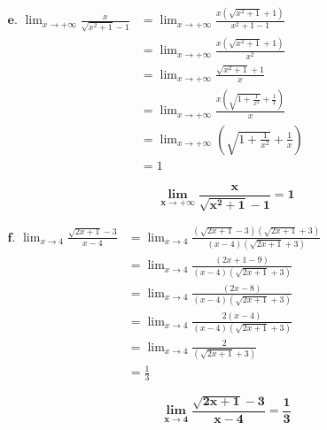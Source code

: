 \documentclass[12pt,a4paper]{article}
\begin{document}
\(
\begin{aligned}
\textbf{e. }\lim_{x \to +\infty} \frac{x}{\sqrt{x^2 +1}-1} &= \lim_{x \to +\infty} \frac{x(\sqrt{x^2 +1}+1)}{x^2 +1-1}\\
																													 &= \lim_{x \to +\infty} \frac{x(\sqrt{x^2 +1}+1)}{x^2}\\
																													 &= \lim_{x \to +\infty} \frac{\sqrt{x^2 +1}+1}{x}\\
																													 &= \lim_{x \to +\infty} \frac{x\left(\sqrt{1 + \frac{1}{x^{2}}}+\frac{1}{x}\right)}{x}\\																													 
																													 &= \lim_{x \to +\infty}\left(\sqrt{1 + \frac{1}{x^{2}}}+\frac{1}{x}\right)\\
																													 &= 1
\end{aligned}
\)

									  \begin{resultbox}
                        \[
                            \mathbf{ \lim_{x \to +\infty} \frac{x}{\sqrt{x^2 +1}-1} = 1 }
                        \]
                    \end{resultbox}	
                    
\(
\begin{aligned}
\textbf{f. }\lim_{x \to 4} \frac{\sqrt{2x + 1} - 3}{x - 4} &= \lim_{x \to 4} \frac{\left(\sqrt{2x + 1} - 3\right)\left(\sqrt{2x + 1} + 3\right)}{(x - 4)\left(\sqrt{2x + 1} + 3\right)}\\
																													 &= \lim_{x \to 4} \frac{\left(2x + 1 - 9\right)}{(x - 4)\left(\sqrt{2x + 1} + 3\right)}\\
																													 &= \lim_{x \to 4} \frac{\left(2x - 8\right)}{(x - 4)\left(\sqrt{2x + 1} + 3\right)}\\
																													 &= \lim_{x \to 4} \frac{2\left(x - 4\right)}{(x - 4)\left(\sqrt{2x + 1} + 3\right)}\\
																													 &= \lim_{x \to 4} \frac{2}{\left(\sqrt{2x + 1} + 3\right)}\\
																													 &=\frac{1}{3}
\end{aligned}
\)

									  \begin{resultbox}
                        \[
                            \mathbf{ \lim_{x \to 4} \frac{\sqrt{2x + 1} - 3}{x - 4} = \frac{1}{3}}
                        \]
                    \end{resultbox}	
                    
\end{document}
